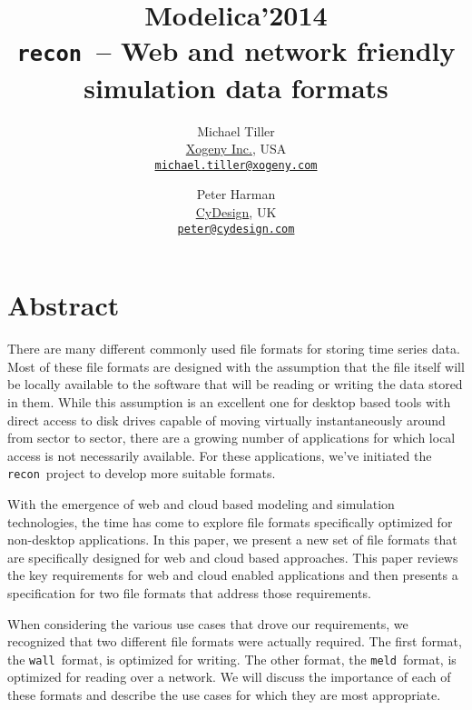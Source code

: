\documentclass[11pt,a4paper,twocolumn]{article}
\newcommand{\recon}{\texttt{recon}}
\newcommand{\wall}{\texttt{wall}}
\newcommand{\meld}{\texttt{meld}}
\begin{document}
\title{\textbf{{\small Modelica'2014}\\
    \recon\  -- Web and network friendly simulation data formats}}

\author{Michael Tiller\\
  \href{http://xogeny.com}{Xogeny Inc.}, USA\\
  \href{mailto:michael.tiller@xogeny.com}
       {\nolinkurl{michael.tiller@xogeny.com}}
  \and Peter Harman\\
  \href{http://www.cydesign.com}
       {CyDesign}, UK\\
  \href{mailto:peter@cydesign.com}{\nolinkurl{peter@cydesign.com}}}
\date{} %
\maketitle\thispagestyle{empty} %

\section*{Abstract}

There are many different commonly used file formats for storing time
series data.  Most of these file formats are designed with the
assumption that the file itself will be locally available to the
software that will be reading or writing the data stored in them.
While this assumption is an excellent one for desktop based tools with
direct access to disk drives capable of moving virtually
instantaneously around from sector to sector, there are a growing
number of applications for which local access is not necessarily
available.  For these applications, we've initiated the
\recon\ project to develop more suitable formats.

With the emergence of web and cloud based modeling and simulation
technologies, the time has come to explore file formats specifically
optimized for non-desktop applications.  In this paper, we present a
new set of file formats that are specifically designed for web and
cloud based approaches.  This paper reviews the key requirements for
web and cloud enabled applications and then presents a specification
for two file formats that address those requirements.

When considering the various use cases that drove our requirements, we
recognized that two different file formats were actually required.
The first format, the \wall\ format, is optimized for writing.  The
other format, the \meld\ format, is optimized for reading over a
network.  We will discuss the importance of each of these formats and
describe the use cases for which they are most appropriate.
\end{document}
